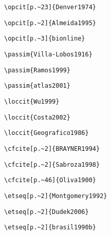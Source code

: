 \begin{alineas}
\begin{verbatim}
\opcit[p.~23]{Denver1974}
\end{verbatim}

\begin{verbatim}
\opcit[p.~2]{Almeida1995}
\end{verbatim}

\begin{verbatim}
\opcit[p.~3]{bionline}
\end{verbatim}

\begin{verbatim}
\passim{Villa-Lobos1916}
\end{verbatim}

\begin{verbatim}
\passim{Ramos1999}
\end{verbatim}

\begin{verbatim}
\passim{atlas2001}
\end{verbatim}

\begin{verbatim}
\loccit{Wu1999}
\end{verbatim}

\begin{verbatim}
\loccit{Costa2002}
\end{verbatim}

\begin{verbatim}
\loccit{Geografico1986}
\end{verbatim}

\begin{verbatim}
\cfcite[p.~2]{BRAYNER1994}
\end{verbatim}

\begin{verbatim}
\cfcite[p.~2]{Sabroza1998}
\end{verbatim}

\begin{verbatim}
\cfcite[p.~46]{Oliva1900}
\end{verbatim}

\begin{verbatim}
\etseq[p.~2]{Montgomery1992}
\end{verbatim}

\begin{verbatim}
\etseq[p.~2]{Dudek2006}
\end{verbatim}

\begin{verbatim}
\etseq[p.~2]{brasil1990b}
\end{verbatim}

\end{alineas}


